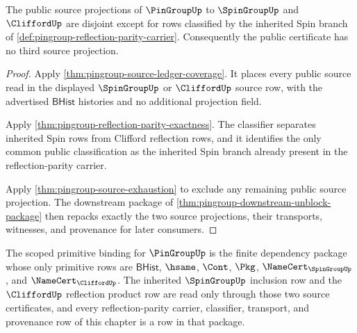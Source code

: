 \begin{theorem}
\label{thm:pingroup-source-projection-no-confusion}
The public source projections of $\PinGroupUp$ to $\SpinGroupUp$ and
$\CliffordUp$ are disjoint except for rows classified by the inherited Spin
branch of \autoref{def:pingroup-reflection-parity-carrier}. Consequently the
public certificate has no third source projection.
\end{theorem}
\begin{proof}
Apply \autoref{thm:pingroup-source-ledger-coverage}. It places every public
source read in the displayed $\SpinGroupUp$ or $\CliffordUp$ source row, with
the advertised $\mathsf{BHist}$ histories and no additional projection field.

Apply \autoref{thm:pingroup-reflection-parity-exactness}. The classifier
separates inherited Spin rows from Clifford reflection rows, and it identifies
the only common public classification as the inherited Spin branch already
present in the reflection-parity carrier.

Apply \autoref{thm:pingroup-source-exhaustion} to exclude any remaining public
source projection. The downstream package of
\autoref{thm:pingroup-downstream-unblock-package} then repacks exactly the two
source projections, their transports, witnesses, and provenance for later
consumers.
\end{proof}

\begin{definition}
\label{def:pingroup-scoped-primitive-binding}
The scoped primitive binding for $\PinGroupUp$ is the finite dependency package
whose only primitive rows are $\mathsf{BHist}$, $\hsame$, $\Cont$, $\Pkg$,
$\NameCert_{\SpinGroupUp}$, and $\NameCert_{\CliffordUp}$. The inherited
$\SpinGroupUp$ inclusion row and the $\CliffordUp$ reflection product row are
read only through those two source certificates, and every reflection-parity
carrier, classifier, transport, and provenance row of this chapter is a row in
that package.
\end{definition}

